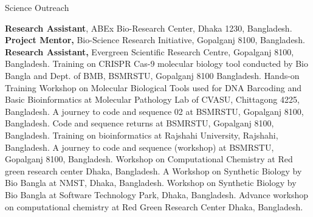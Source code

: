 \begin{rubric}{Science Outreach}

\entry*[Jan 2021-] \textbf{Research Assistant}, ABEx Bio-Research Center, Dhaka 1230, Bangladesh.
\entry*[Mar 2020 -] \textbf{Project Mentor,}  Bio-Science Research Initiative, Gopalganj 8100, Bangladesh.
\entry*[Jan 2018 -] \textbf{Research Assistant,}  Evergreen Scientific Research Centre, Gopalganj 8100, Bangladesh.
\entry*[Mar 29, 2020] \textbf{}Training on CRISPR Cas-9 molecular biology tool conducted by Bio Bangla and Dept. of BMB, BSMRSTU, Gopalganj 8100 Bangladesh.
\entry*[Mar 08, 2019] \textbf{}Hands-on Training Workshop on Molecular Biological Tools used for DNA Barcoding and Basic Bioinformatics at Molecular Pathology Lab of CVASU, Chittagong 4225, Bangladesh.
\entry*[Apr 22, 2018] \textbf{}A journey to code and sequence 02 at BSMRSTU, Gopalganj 8100, Bangladesh.
\entry*[Apr 06, 2018] \textbf{}Code and sequence returns at BSMRSTU, Gopalganj 8100, Bangladesh.
\entry*[Feb 10, 2018] \textbf{}Training on bioinformatics at Rajshahi University, Rajshahi, Bangladesh.
\entry*[Jan 02, 2018] \textbf{}A journey to code and sequence (workshop) at BSMRSTU, Gopalganj 8100, Bangladesh.
\entry*[Oct 29, 2017] \textbf{}Workshop on Computational Chemistry at Red green research center Dhaka, Bangladesh.
\entry*[Sep 11, 2017] \textbf{}A Workshop on Synthetic Biology by Bio Bangla at NMST, Dhaka, Bangladesh.
\entry*[Aug 06, 2017] \textbf{}Workshop on Synthetic Biology by Bio Bangla at Software Technology Park, Dhaka, Bangladesh.
\entry*[Apr 11, 2017] \textbf{}Advance workshop on computational chemistry at Red Green Research Center Dhaka, Bangladesh.

\end{rubric}